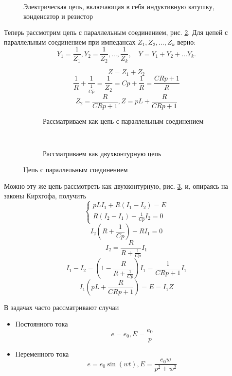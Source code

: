 \begin{figure}[h]
	\caption{Электрическая цепь, включающая в себя индуктивную катушку, конденсатор и резистор}\label{ch14posl}

\end{figure}

Теперь рассмотрим цепь с параллельным соединением, рис. \ref{ch14par1}. Для цепей с параллельным соединением при импедансах $Z_1, Z_2, \ldots, Z_k$ верно: $$Y_1 = \frac{1}{Z_1}, Y_2 = \frac{1}{Z_2}, \ldots, \frac{1}{Z_k}, \quad Y = Y_1 + Y_2 + \ldots Y_k .$$

$$Z = Z_1 + Z_2$$
$$\frac{1}{R} + \frac{1}{\frac{1}{Cp}} = \frac{1}{Z_2} = Cp + \frac{1}{R} = \frac{CRp + 1}{R}$$
$$ Z_2 = \frac{R}{CRp + 1}, Z = pL +   \frac{R}{CRp + 1}$$

\begin{figure}[h]
	\centering
	
	\begin{subfigure}[t]{0.4\textwidth}
	\caption{Рассматриваем как цепь с параллельным соединением}\label{ch14par1}
	\end{subfigure}
	~ ~ ~ ~               
	\begin{subfigure}[t]{0.4\textwidth}
	\caption{Рассматриваем как двухконтурную цепь}\label{ch14par2}
	\end{subfigure}
	
	\caption{Цепь с параллельным соединением}\label{ch14par}
\end{figure}
 
Можно эту же цепь рассмотреть как двухконтурную, рис. \ref{ch14par2}, и, опираясь на законы Кирхгофа, получить 
$$
\begin{cases}
pLI_1 + R(I_1 - I_2) = E \\
R(I_2 - I_1) + \frac{1}{Cp} I_2 = 0
\end{cases}
$$
$$ I_2 (R + \frac{1}{Cp}) - RI_1 = 0$$
$$ I_2 = \frac{R}{R + \frac{1}{Cp}} I_1$$
$$ I_1 - I_2 = (1 - \frac{R}{R + \frac{1}{Cp}})I_1 = \frac{1}{CRp + 1} I_1$$
$$I_1 (pL + \frac{R}{CRp + 1}) = E = I_1 Z $$

В задачах часто рассматривают случаи 
\begin{itemize}
\item Постоянного тока
$$ e = e_0, E = \frac{e_0}{p}$$
\item Переменного тока
$$e = e_0 \sin(wt), E = \frac{e_0 w}{p^2 + w^2} $$
\end{itemize}


